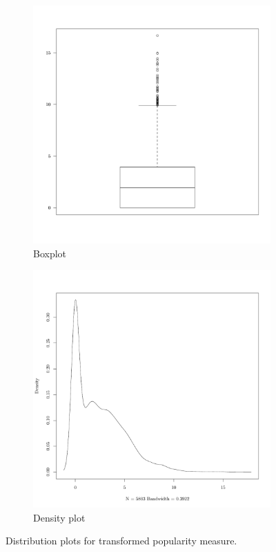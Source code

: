 \begin{figure}
    \centering
    \begin{subfigure}[b]{0.3\textwidth}
        \includegraphics[width=\textwidth]{figures/popuTransformedBox}
        \caption{Boxplot}
        \label{fig:popuTransformedBox}
    \end{subfigure}
    \quad
    \begin{subfigure}[b]{0.3\textwidth}
        \includegraphics[width=\textwidth]{figures/popuTransformedDensity}
        \caption{Density plot}
        \label{fig:popuTransformedDensity}
    \end{subfigure}
    \caption{Distribution plots for transformed popularity measure.}
\end{figure}

